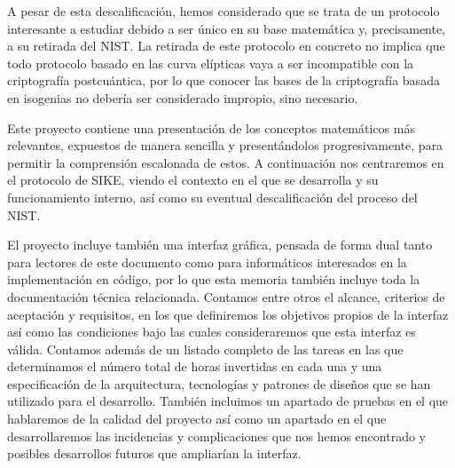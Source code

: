A pesar de esta descalificación, hemos considerado que se trata de un protocolo interesante a estudiar debido a ser único en su base matemática y, precisamente, a su retirada del NIST. La retirada de este protocolo en concreto no implica que todo protocolo basado en las curva elípticas vaya a ser incompatible con la criptografía postcuántica, por lo que conocer las bases de la criptografía basada en isogenias no debería ser considerado impropio, sino necesario.

Este proyecto contiene una presentación de los conceptos matemáticos más relevantes, expuestos de manera sencilla y presentándolos progresivamente, para permitir la comprensión escalonada de estos. A continuación nos centraremos en el protocolo de SIKE, viendo el contexto en el que se desarrolla y su funcionamiento interno, así como su eventual descalificación del proceso del NIST.

El proyecto incluye también una interfaz gráfica, pensada de forma dual tanto para lectores de este documento como para informáticos interesados en la implementación en código, por lo que esta memoria también incluye toda la documentación técnica relacionada. Contamos entre otros el alcance, criterios de aceptación y requisitos, en los que definiremos los objetivos propios de la interfaz así como las condiciones bajo las cuales consideraremos que esta interfaz es válida. Contamos además de un listado completo de las tareas en las que determinamos el número total de horas invertidas en cada una y una especificación de la arquitectura, tecnologías y patrones de diseños que se han utilizado para el desarrollo. También incluimos un apartado de pruebas en el que hablaremos de la calidad del proyecto así como un apartado en el que desarrollaremos las incidencias y complicaciones que nos hemos encontrado y posibles desarrollos futuros que ampliarían la interfaz.
